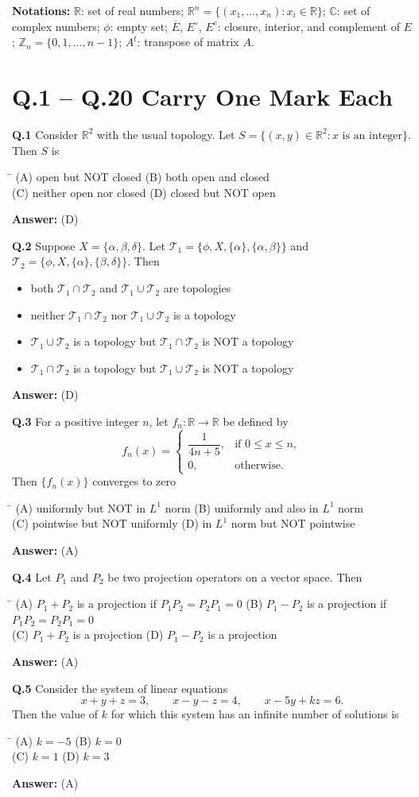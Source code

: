 \documentclass[11pt,a4paper]{article}
\newcommand{\optsfourA}[4]{%
  \begin{tabbing}
    \hspace{0.48\linewidth}\=\kill
    (A) #1 \> (B) #2 \\[2pt]
    (C) #3 \> (D) #4
  \end{tabbing}%
}
\newcommand{\optslistA}[4]{%
  \begin{itemize}
    \setlength{\itemsep}{2pt}\setlength{\parskip}{0pt}
    \item[(A)] #1
    \item[(B)] #2
    \item[(C)] #3
    \item[(D)] #4
  \end{itemize}%
}
\newcommand{\ans}[1]{\textbf{Answer:} #1\par\medskip}
\begin{document}
\medskip
\textbf{Notations:} $\mathbb{R}$: set of real numbers; $\mathbb{R}^n = \{(x_1,\dots,x_n) : x_i \in \mathbb{R}\}$; $\mathbb{C}$: set of complex numbers; $\phi$: empty set; $\overline{E}$, $E^\circ$, $E^c$: closure, interior, and complement of $E$; $\mathbb{Z}_n = \{0, 1, \dots, n-1\}$; $A^t$: transpose of matrix $A$.

\section*{Q.1 -- Q.20 Carry One Mark Each}

\textbf{Q.1} Consider $\mathbb{R}^2$ with the usual topology. Let $S = \{(x, y) \in \mathbb{R}^2 : x \text{ is an integer}\}$. Then $S$ is
\optsfourA{open but NOT closed}{both open and closed}{neither open nor closed}{closed but NOT open}
\ans{(D)}

\textbf{Q.2} Suppose $X = \{\alpha, \beta, \delta\}$. Let $\mathcal{T}_1 = \{\phi, X, \{\alpha\}, \{\alpha, \beta\}\}$ and $\mathcal{T}_2 = \{\phi, X, \{\alpha\}, \{\beta, \delta\}\}$. Then
\optslistA{both $\mathcal{T}_1 \cap \mathcal{T}_2$ and $\mathcal{T}_1 \cup \mathcal{T}_2$ are topologies}{neither $\mathcal{T}_1 \cap \mathcal{T}_2$ nor $\mathcal{T}_1 \cup \mathcal{T}_2$ is a topology}{$\mathcal{T}_1 \cup \mathcal{T}_2$ is a topology but $\mathcal{T}_1 \cap \mathcal{T}_2$ is NOT a topology}{$\mathcal{T}_1 \cap \mathcal{T}_2$ is a topology but $\mathcal{T}_1 \cup \mathcal{T}_2$ is NOT a topology}
\ans{(D)}

\textbf{Q.3} For a positive integer $n$, let $f_n : \mathbb{R} \to \mathbb{R}$ be defined by
\[
  f_n(x) = \begin{cases} \dfrac{1}{4n + 5}, & \text{if } 0 \le x \le n, \\ 0, & \text{otherwise.} \end{cases}
\]
Then $\{f_n(x)\}$ converges to zero
\optsfourA{uniformly but NOT in $L^1$ norm}{uniformly and also in $L^1$ norm}{pointwise but NOT uniformly}{in $L^1$ norm but NOT pointwise}
\ans{(A)}

\textbf{Q.4} Let $P_1$ and $P_2$ be two projection operators on a vector space. Then
\optsfourA{$P_1 + P_2$ is a projection if $P_1 P_2 = P_2 P_1 = 0$}{$P_1 - P_2$ is a projection if $P_1 P_2 = P_2 P_1 = 0$}{$P_1 + P_2$ is a projection}{$P_1 - P_2$ is a projection}
\ans{(A)}

\textbf{Q.5} Consider the system of linear equations
\[
  x + y + z = 3, \qquad x - y - z = 4, \qquad x - 5y + kz = 6.
\]
Then the value of $k$ for which this system has an infinite number of solutions is
\optsfourA{$k = -5$}{$k = 0$}{$k = 1$}{$k = 3$}
\ans{(A)}
\end{document}
